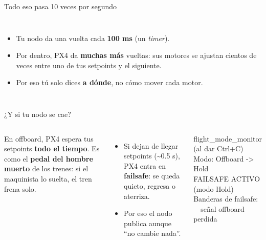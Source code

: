 \documentclass[aspectratio=169,10pt]{beamer}
\begin{document}
\begin{frame}{Todo eso pasa 10 veces por segundo}
  \begin{columns}[c]
    \centering
    \small
    \begin{itemize}
      \item Tu nodo da una vuelta cada \textbf{100 ms} (un \emph{timer}).
      \item Por dentro, PX4 da \textbf{muchas más} vueltas: sus motores se ajustan cientos de veces entre
        uno de tus setpoints y el siguiente.
      \item Por eso tú solo dices \textbf{a dónde}, no cómo mover cada motor.
    \end{itemize}
  \end{columns}
\end{frame}

\begin{frame}{¿Y si tu nodo se cae?}
  \begin{columns}[c]
    \small
    En offboard, PX4 espera tus setpoints \textbf{todo el tiempo}. Es como el \textbf{pedal del hombre muerto} de
    los trenes: si el maquinista lo suelta, el tren frena solo.
    \begin{itemize}
      \item Si dejan de llegar setpoints (\textasciitilde0.5 s), PX4 entra en \textbf{failsafe}: se queda
        quieto, regresa o aterriza.
      \item Por eso el nodo publica aunque ``no cambie nada''.
    \end{itemize}
    \begin{terminal}{flight\_mode\_monitor (al dar Ctrl+C)}
Modo: Offboard -> Hold\\
FAILSAFE ACTIVO (modo Hold)\\
Banderas de failsafe:\\
\ \ señal offboard perdida
    \end{terminal}
  \end{columns}
\end{frame}
\end{document}
